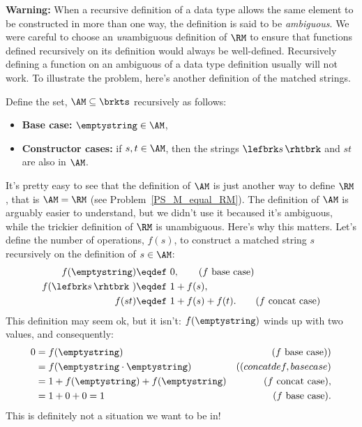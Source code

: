 \textbf{Warning:} When a recursive definition of a data type allows
the same element to be constructed in more than one way, the
definition is said to be \emph{ambiguous}.  We were careful to choose
an \emph{un}ambiguous definition of $\RM$ to ensure that functions
defined recursively on its definition would always be well-defined.
Recursively defining a function on an ambiguous of a data type
definition usually will not work.  To illustrate the problem, here's
another definition of the matched strings.

\iffalse Recursive definitions of tagged data types, where the tag
uniquely determines the rule used to construct an element, are guaranteed
to be unambiguous.r
\fi

\begin{definition}
\label{M}
Define the set, $\AM \subseteq \brkts$ recursively as follows:
\begin{itemize}

\item \textbf{Base case:} $\emptystring \in \AM$,

\item \textbf{Constructor cases:} if $s,t \in \AM$, then
  the strings $\lefbrk s\, \rhtbrk$ and $st$ are also in $\AM$.
\end{itemize}
\end{definition}

\iffalse
\begin{notesproblem}
Give an easy proof by structural induction that $\AM =\RM$.
\end{notesproblem}
\fi

It's pretty easy to see that the definition of $\AM$ is just another way
to define $\RM$, that is $\AM = \RM$ (see Problem~\ref{PS_M_equal_RM}).
The definition of $\AM$ is arguably easier to understand, but we didn't
use it becaused it's ambiguous, while the trickier definition of $\RM$ is
unambiguous.  Here's why this matters.  Let's define the number of
operations, $f(s)$, to construct a matched string $s$ recursively on the
definition of $s \in \AM$:
\begin{align*}
  f(\emptystring)        & \eqdef\ 0, \tag{$f$ base case}\\
  f(\lefbrk s\,\rhtbrk\ ) & \eqdef\ 1+ f(s), \\
  f(st)                  & \eqdef\ 1+ f(s) +f(t).\tag{$f$ concat case}
\end{align*}
This definition may seem ok, but it isn't:
$f(\emptystring)$ winds up with two values, and consequently:
\begin{align*}
0 & = f(\emptystring) & \text{($f$ base case))}\\
  & = f(\emptystring \cdot \emptystring) & ((concat def, base case) \\
                & = 1 + f(\emptystring) + f(\emptystring)
                      &  \text{($f$ concat case)},\\
                & = 1 + 0 + 0 = 1
                      & \text{($f$ base case)}.
\end{align*}
This is definitely not a situation we want to be in!


